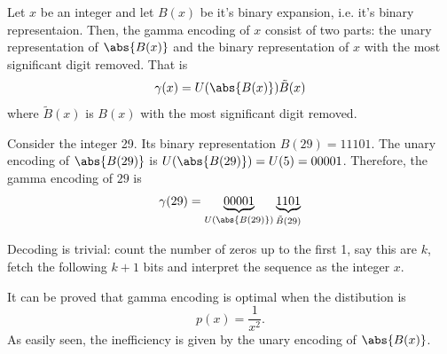 \documentclass{subfiles}
\begin{document}
    Let \(x\) be an integer and let \(B(x)\) be it's binary expansion,
        i.e. it's binary representaion. Then, the gamma encoding of \(x\)
        consist of two parts: the unary representation of \(\abs{B(x)}\) and 
        the binary representation of \(x\) with the most significant digit removed.
        That is 
        \[
            \gamma(x) = U(\abs{B(x)}) \tilde{B}(x)
        \]
        where \(\tilde{B}(x)\) is \(B(x)\) with the most significant digit removed.

    \begin{example*}
        Consider the integer 29. Its binary representation \(B(29) = 11101\).
            The unary encoding of \(\abs{B(29)}\) is \(U(\abs{B(29)}) = U(5) = 00001\).
            Therefore, the gamma encoding of \(29\) is
            \[
                \gamma(29) = \underbrace{00001}_{U(\abs{B(29)})}
                    \underbrace{1101}_{\tilde{B}(29)}
            \]
    \end{example*}

    Decoding is trivial: count the number of zeros up to the first 1,
        say this are \(k\), fetch the following \(k + 1\) bits and interpret the 
        sequence as the integer \(x\). 

    It can be proved that gamma encoding is optimal when the distibution is 
        \[
            p(x) = \frac{1}{x^{2}}.
        \]
        As easily seen, the inefficiency is given by the unary encoding of \(\abs{B(x)}\).
\end{document}
